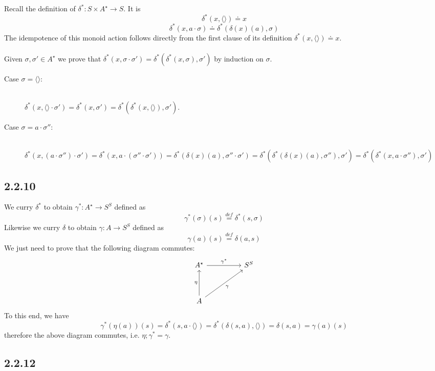 \documentclass{article}
\newcommand{\defeq}{\overset{\mathit{def}}{=}}
\begin{document}
Recall the definition of $\delta^* : S \times A^{\star} \to S$. It is
$$\delta^*(x, \langle \rangle) \doteq x$$
$$\delta^*(x, a \cdot \sigma) \doteq \delta^*(\delta(x)(a), \sigma)$$
The idempotence of this monoid action follows directly from the first clause of its definition 
$\delta^*(x, \langle \rangle) \doteq x$. \\~\\
Given $\sigma,\sigma' \in A^\star$ we prove that 
$\delta^*(x, \sigma \cdot \sigma') = \delta^*(\delta^*(x, \sigma), \sigma')$ by induction on $\sigma$.
\begin{description}
\item[Case $\sigma = \langle \rangle$:]~\\
$\delta^*(x, \langle \rangle \cdot \sigma') = \delta^*(x, \sigma') = \delta^*(\delta^*(x, \langle \rangle), \sigma')$.
\item[Case $\sigma = a \cdot \sigma''$:]~\\
$\delta^*(x, (a \cdot \sigma'') \cdot \sigma') = \delta^*(x, a \cdot (\sigma'' \cdot \sigma')) = 
\delta^*(\delta(x)(a), \sigma'' \cdot \sigma') = \delta^*(\delta^*(\delta(x)(a), \sigma''), \sigma')
= \delta^*(\delta^*(x,a \cdot \sigma''), \sigma')$ 
\end{description}

\subsection*{2.2.10}

We curry $\delta^*$ to obtain $\gamma^* : A^{\star} \to S^S$ defined as
$$\gamma^*(\sigma)(s) \defeq \delta^{*}(s, \sigma)$$
Likewise we curry $\delta$ to obtain $\gamma : A \to S^S$ defined as
$$\gamma(a)(s) \defeq \delta(a,s)$$
We just need to prove that the following diagram commutes:
\[\begin{tikzcd}
	{A^\star} && {S^S} \\
	\\
	A
	\arrow["\gamma"', from=3-1, to=1-3]
	\arrow["\eta", from=3-1, to=1-1]
	\arrow["{\gamma^*}", from=1-1, to=1-3]
\end{tikzcd}\]
To this end, we have
$$\gamma^*(\eta(a))(s) = \delta^*(s, a \cdot \langle \rangle) = \delta^*(\delta(s,a), \langle \rangle) = \delta(s,a) = \gamma(a)(s)$$
therefore the above diagram commutes, i.e. $\eta;\gamma^* = \gamma$.

\subsection*{2.2.12}
\end{document}
